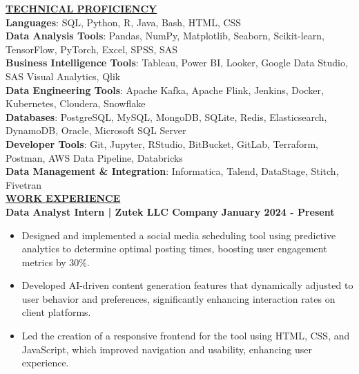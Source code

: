 \documentclass{article}
\begin{document}
\noindent \textbf{\underline{TECHNICAL PROFICIENCY}} \\
\textbf{Languages}{: \small SQL, Python, R, Java, Bash, HTML, CSS} \\
\textbf{Data Analysis Tools}{: \small Pandas, NumPy, Matplotlib, Seaborn, Scikit-learn, TensorFlow, PyTorch, Excel, SPSS, SAS} \\
\textbf{Business Intelligence Tools}{: \small Tableau, Power BI, Looker, Google Data Studio, SAS Visual Analytics, Qlik} \\
\textbf{Data Engineering Tools}{: \small Apache Kafka, Apache Flink, Jenkins, Docker, Kubernetes, Cloudera, Snowflake} \\
\textbf{Databases}{: \small PostgreSQL, MySQL, MongoDB, SQLite, Redis, Elasticsearch, DynamoDB, Oracle, Microsoft SQL Server} \\
\textbf{Developer Tools}{: \small Git, Jupyter, RStudio, BitBucket, GitLab, Terraform, Postman, AWS Data Pipeline, Databricks} \\
\textbf{Data Management \& Integration}{: \small Informatica, Talend, DataStage, Stitch, Fivetran} \\


\noindent \textbf{\underline{WORK EXPERIENCE}}\\
\noindent \textbf{Data Analyst Intern | Zutek LLC Company} \hfill \textbf{January 2024 - Present}
\begin{itemize}[noitemsep,nolistsep,leftmargin=*]
\item {\small Designed and implemented a social media scheduling tool using predictive analytics to determine optimal posting times, boosting user engagement metrics by 30\%.}
\item {\small Developed AI-driven content generation features that dynamically adjusted to user behavior and preferences, significantly enhancing interaction rates on client platforms.}
\item {\small Led the creation of a responsive frontend for the tool using HTML, CSS, and JavaScript, which improved navigation and usability, enhancing user experience.}\\
\end{itemize}
\end{document}
